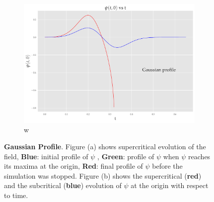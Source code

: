 \begin{figure}
    \begin{subfigure}[b]{0.85\textwidth}
        \includegraphics[width=1\linewidth]{images/at0_Gaussian.pdf}w
        \caption{}
        \label{fig:Ng2}
    \end{subfigure}
    \caption[Gaussian profile field evolution]{\textbf{Gaussian Profile}. Figure (a) shows supercritical evolution of the field, \textbf{Blue}: initial profile of $\psi$ , \textbf{Green}: profile of $\psi$ when $\psi$ reaches its maxima at the origin, \textbf{Red}: final profile of $\psi$ before the simulation was stopped. Figure (b) shows the supercritical (\textbf{red}) and the subcritical (\textbf{blue}) evolution of $\psi$ at the origin with respect to time.}
\end{figure}



